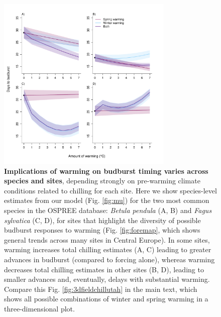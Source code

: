 \documentclass{article}
\begin{document}
\begin{figure}[h!]
\centering
\noindent \includegraphics[width=0.75\textwidth]{..//..//analyses/bb_analysis/figures/forecasting/tempforecastbothspp_1_7_degwarm.pdf}
\caption{\textbf{Implications of warming on budburst timing varies across species and sites}, depending strongly on pre-warming climate conditions related to chilling for each site. Here we show species-level estimates from our model (Fig. \ref{fig:mu}) for the two most common species in the OSPREE database: \emph{Betula pendula} (A, B) and \emph{Fagus sylvatica} (C, D), for sites that highlight the diversity of possible budburst responses to warming (Fig. \ref{fig:foremap}, which shows general trends across many sites in Central Europe). In some sites, warming increases total chilling estimates (A, C) leading to greater advances in budburst (compared to forcing alone), whereas warming decreases total chilling estimates in other sites (B, D), leading to smaller advances and, eventually, delays with substantial warming. Compare this Fig. \ref{fig:3dfieldchillutah} in the main text, which shows all possible combinations of winter and spring warming in a three-dimensional plot.}
\label{fig:betfag2d}
\end{figure}
\end{document}
